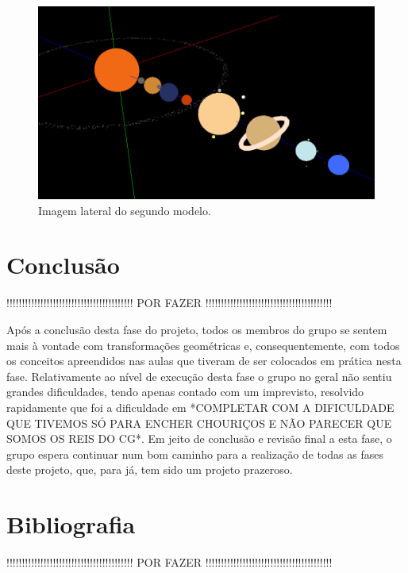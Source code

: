 \documentclass[a4paper]{article}
\begin{document}
\begin{figure}[H]
\centering
\includegraphics[scale=0.4]{modelo2_2.png}
\caption{Imagem lateral do segundo modelo.}
\label{img:modelo2_2}
\end{figure}


\newpage

\section{Conclusão}
\label{sec:conclusao}

!!!!!!!!!!!!!!!!!!!!!!!!!!!!!!!!!!!!!!!!! POR FAZER !!!!!!!!!!!!!!!!!!!!!!!!!!!!!!!!!!!!!!!!!

Após a conclusão desta fase do projeto, todos os membros do grupo se sentem mais à vontade com transformações geométricas e, consequentemente, com todos os conceitos apreendidos nas aulas que tiveram de ser colocados em prática nesta fase. Relativamente ao nível de execução desta fase o grupo no geral não sentiu grandes dificuldades, tendo apenas contado com um imprevisto, resolvido rapidamente que foi a dificuldade em *COMPLETAR COM A DIFICULDADE QUE TIVEMOS SÓ PARA ENCHER CHOURIÇOS E NÃO PARECER QUE SOMOS OS REIS DO CG*.
Em jeito de conclusão e revisão final a esta fase, o grupo espera continuar num bom caminho para a realização de todas as fases deste projeto, que, para já, tem sido um projeto prazeroso.

\section{Bibliografia}
\label{sec:bibliografia}

!!!!!!!!!!!!!!!!!!!!!!!!!!!!!!!!!!!!!!!!! POR FAZER !!!!!!!!!!!!!!!!!!!!!!!!!!!!!!!!!!!!!!!!!
\end{document}
